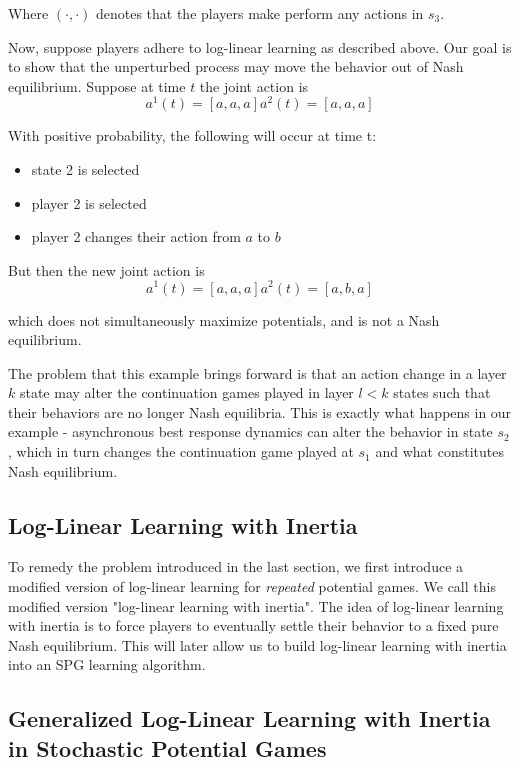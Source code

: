 \begin{eg}
Where $(\cdot, \cdot)$ denotes that the players make perform any actions in $s_3$. 

Now, suppose players adhere to log-linear learning as described above. Our goal is to show that the unperturbed process may move the behavior out of Nash equilibrium. Suppose at time $t$ the joint action is
$$
a^1(t) = [a, a, a]
a^2(t) = [a, a, a]
$$

With positive probability, the following will occur at time t:
\begin{itemize}
\item state 2 is selected
\item player 2 is selected
\item player 2 changes their action from $a$ to $b$
\end{itemize}

But then the new joint action is
$$
a^1(t) = [a, a, a]
a^2(t) = [a, b, a]
$$

which does not simultaneously maximize potentials, and is not a Nash equilibrium.

\end{eg}

The problem that this example brings forward is that an action change in a layer $k$ state may alter the continuation games played in layer $l < k$ states such that their behaviors are no longer Nash equilibria. This is exactly what happens in our example - asynchronous best response dynamics can alter the behavior in state $s_2$, which in turn changes the continuation game played at $s_1$ and what constitutes Nash equilibrium.



\subsection{Log-Linear Learning with Inertia}

To remedy the problem introduced in the last section, we first introduce a modified version of log-linear learning for {\em repeated} potential games. We call this modified version "log-linear learning with inertia". The idea of log-linear learning with inertia is to force players to eventually settle their behavior to a fixed pure Nash equilibrium. This will later allow us to build log-linear learning with inertia into an SPG learning algorithm. 

\subsection{Generalized Log-Linear Learning with Inertia in Stochastic Potential Games}

